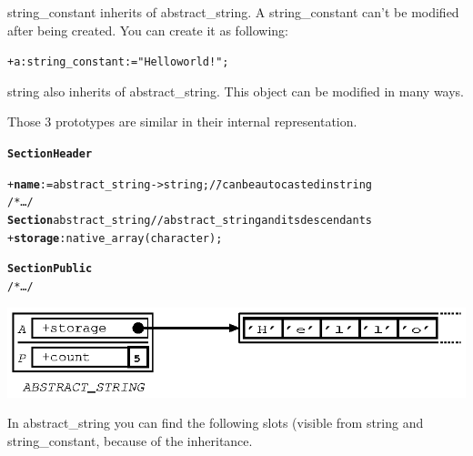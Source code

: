 \documentclass[11pt]{mybook}
\begin{document}
{\sc{}string\_constant} inherits of {\sc{}abstract\_string}. A {\sc{}string\_constant} can't be modified after being created.
You can create it as following:
\begin{alltt}
  + a:{\sc{}string\_constant} := "Hello world !";
\end{alltt}

{\sc{}string} also inherits of {\sc{}abstract\_string}. This object can be modified in many ways.

Those 3 prototypes are similar in their internal representation.
\begin{alltt}
{\bf{}Section Header}
\begin{tabbing}
  + {\bf{}name} := {\sc{}abstract\_string} -> {\sc{}string};    \= // can be autocasted in {\sc{}string} \\

  /* \ldots */  \\
{\bf{}Section} {\sc{}abstract\_string}                          \> // {\sc{}abstract\_string} and its descendants \\
  + {\bf{}storage}:{\sc{}native\_array}({\sc{}character});
\end{tabbing}
{\bf{}Section Public}
  /* \ldots */
\end{alltt}
\begin{center}
\includegraphics[scale=1.1]{figures/string1}
\end{center}
In {\sc{}abstract\_string} you can find the following slots (visible from {\sc{}string} and {\sc{}string\_constant}, because of the inheritance.
\end{document}
